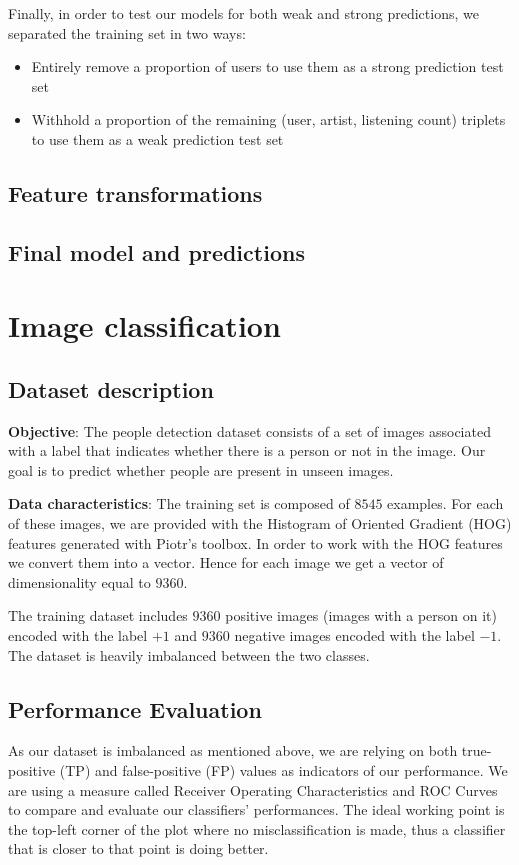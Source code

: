 \documentclass{article}
\begin{document}
  Finally, in order to test our models for both weak and strong predictions, we separated the training set in two ways:
  \begin{itemize}
    \item Entirely remove a proportion of users to use them as a strong prediction test set
    \item Withhold a proportion of the remaining (user, artist, listening count) triplets to use them as a weak prediction test set
  \end{itemize}

  \subsection{Feature transformations}

  \subsection{Final model and predictions}



\section{Image classification}

  \subsection{Dataset description}
  \textbf{Objective}: The people detection dataset consists of a set of images associated with a label that indicates whether there is a person or not in the image. Our goal is to predict whether people are present in unseen images.

  \textbf{Data characteristics}: The training set is composed of $8545$ examples. For each of these images, we are provided with the Histogram of Oriented Gradient (HOG) features generated with Piotr's toolbox. In order to work with the HOG features we convert them into a vector. Hence for each image we get a vector of dimensionality equal to $9360$.

  The training dataset includes $9360$ positive images (images with a person on it) encoded with the label $+1$ and $9360$ negative images encoded with the label $-1$. The dataset is heavily imbalanced between the two classes.

  \subsection{Performance Evaluation}
  As our dataset is imbalanced as mentioned above, we are relying on both true-positive (TP) and false-positive (FP) values as indicators of our performance. We are using a measure called Receiver Operating Characteristics and ROC Curves to compare and evaluate our classifiers' performances. The ideal working point is the top-left corner of the plot where no misclassification is made, thus a classifier that is closer to that point is doing better.
\end{document}
